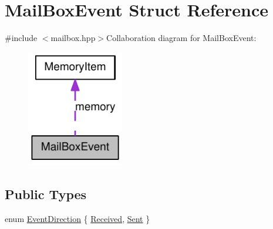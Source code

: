 \hypertarget{struct_mail_box_event}{
\section{MailBoxEvent Struct Reference}
\label{struct_mail_box_event}
}


{\ttfamily \#include $<$mailbox.hpp$>$}Collaboration diagram for MailBoxEvent:\nopagebreak
\begin{figure}[H]
\begin{center}
\leavevmode
\includegraphics[width=120pt]{struct_mail_box_event__coll__graph}
\end{center}
\end{figure}
\subsection*{Public Types}
\begin{DoxyCompactItemize}
\item 
enum \hyperlink{struct_mail_box_event_a6c002ae6d74d407ec5b7a4a59dc6fbec}{EventDirection} \{ \hyperlink{struct_mail_box_event_a6c002ae6d74d407ec5b7a4a59dc6fbeca529850a3716905f03cbc5ca10da7885a}{Received}, 
\hyperlink{struct_mail_box_event_a6c002ae6d74d407ec5b7a4a59dc6fbeca2a4d4b0717a4d028e8e9ceadb33d9281}{Sent}
 \}
\end{DoxyCompactItemize}
